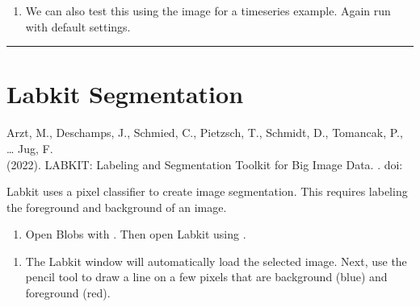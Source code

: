 \documentclass[letterpaper,10pt,english]{jupyterBook}
\begin{document}
\sphinxAtStartPar
{}

\sphinxAtStartPar
{}
\begin{enumerate}
%
\setcounter{enumi}{4}
\item {} 
\sphinxAtStartPar
We can also test this using the image  for a timeseries example. Again run with default settings.

\end{enumerate}


\bigskip\hrule\bigskip


\sphinxstepscope


\chapter{Labkit Segmentation}
\label{\detokenize{labkit:labkit-segmentation}}\label{\detokenize{labkit::doc}}
\sphinxAtStartPar
{}

\sphinxAtStartPar
Arzt, M., Deschamps, J., Schmied, C., Pietzsch, T., Schmidt, D., Tomancak, P., … Jug, F.\\
(2022). LABKIT: Labeling and Segmentation Toolkit for Big Image Data. . doi:

\sphinxAtStartPar
Labkit uses a pixel classifier to create image segmentation. This requires labeling the foreground and background of an image.
\begin{enumerate}
%
\item {} 
\sphinxAtStartPar
Open Blobs with . Then open Labkit using .

\end{enumerate}

\sphinxAtStartPar
{}
\begin{enumerate}
%
\setcounter{enumi}{1}
\item {} 
\sphinxAtStartPar
The Labkit window will automatically load the selected image. Next, use the pencil tool to draw a line on a few pixels that are background (blue) and foreground (red).

\end{enumerate}
\end{document}
